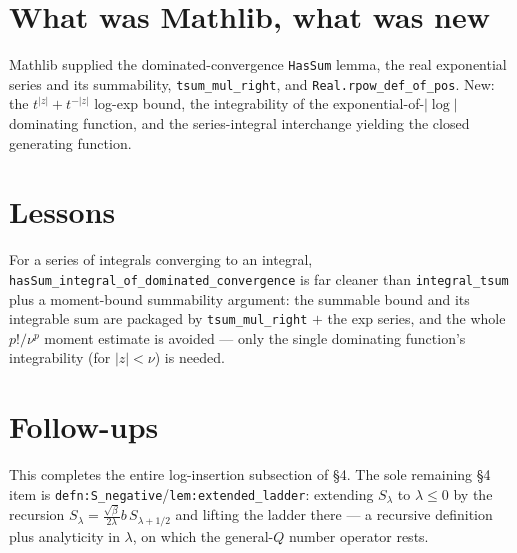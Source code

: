 \documentclass[11pt]{article}
\begin{document}
\section{What was Mathlib, what was new}
Mathlib supplied the dominated-convergence \texttt{HasSum} lemma, the real exponential series and its
summability, \texttt{tsum\_mul\_right}, and \texttt{Real.rpow\_def\_of\_pos}. New: the $t^{|z|}+t^{-|z|}$
log-exp bound, the integrability of the exponential-of-$|\log|$ dominating function, and the
series-integral interchange yielding the closed generating function.

\section{Lessons}
For a series of integrals converging to an integral, \texttt{hasSum\_integral\_of\_dominated\_convergence}
is far cleaner than \texttt{integral\_tsum} plus a moment-bound summability argument: the summable bound
and its integrable sum are packaged by \texttt{tsum\_mul\_right} $+$ the exp series, and the whole
$p!/\nu^p$ moment estimate is avoided --- only the single dominating function's integrability (for
$|z|<\nu$) is needed.

\section{Follow-ups}
This completes the entire log-insertion subsection of \S4. The sole remaining \S4 item is
\texttt{defn:S\_negative}/\texttt{lem:extended\_ladder}: extending $S_\lambda$ to $\lambda\le0$ by the
recursion $S_\lambda=\frac{\sqrt\beta}{2\lambda}b\,S_{\lambda+1/2}$ and lifting the ladder there --- a
recursive definition plus analyticity in $\lambda$, on which the general-$Q$ number operator rests.
\end{document}
